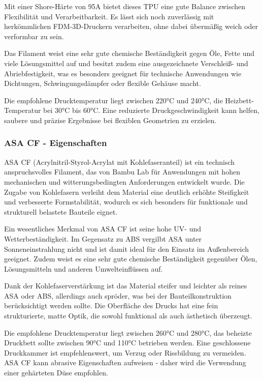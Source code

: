 \documentclass[a4paper,12pt]{article}
\begin{document}
Mit einer Shore-Härte von 95A bietet dieses TPU eine gute Balance zwischen Flexibilität und Verarbeitbarkeit. Es lässt sich noch zuverlässig mit herkömmlichen FDM-3D-Druckern verarbeiten, ohne dabei übermäßig weich oder verformbar zu sein.

Das Filament weist eine sehr gute chemische Beständigkeit gegen Öle, Fette und viele Lösungsmittel auf und besitzt zudem eine ausgezeichnete Verschleiß- und Abriebfestigkeit, was es besonders geeignet für technische Anwendungen wie Dichtungen, Schwingungsdämpfer oder flexible Gehäuse macht.

Die empfohlene Drucktemperatur liegt zwischen 220°C und 240°C, die Heizbett-Temperatur bei 30°C bis 60°C. Eine reduzierte Druckgeschwindigkeit kann helfen, saubere und präzise Ergebnisse bei flexiblen Geometrien zu erzielen.\cite{Bambu_Lab_Filament_TPU}\newline

\subsubsection{ASA CF - Eigenschaften}
\label{sec:ASA CF}

ASA CF (Acrylnitril-Styrol-Acrylat mit Kohlefaseranteil) ist ein technisch anspruchsvolles Filament, das von Bambu Lab für Anwendungen mit hohen mechanischen und witterungsbedingten Anforderungen entwickelt wurde. Die Zugabe von Kohlefasern verleiht dem Material eine deutlich erhöhte Steifigkeit und verbesserte Formstabilität, wodurch es sich besonders für funktionale und strukturell belastete Bauteile eignet.

Ein wesentliches Merkmal von ASA CF ist seine hohe UV- und Wetterbeständigkeit. Im Gegensatz zu ABS vergilbt ASA unter Sonneneinstrahlung nicht und ist damit ideal für den Einsatz im Außenbereich geeignet. Zudem weist es eine sehr gute chemische Beständigkeit gegenüber Ölen, Lösungsmitteln und anderen Umwelteinflüssen auf.

Dank der Kohlefaserverstärkung ist das Material steifer und leichter als reines ASA oder ABS, allerdings auch spröder, was bei der Bauteilkonstruktion berücksichtigt werden sollte. Die Oberfläche des Drucks hat eine fein strukturierte, matte Optik, die sowohl funktional als auch ästhetisch überzeugt.

Die empfohlene Drucktemperatur liegt zwischen 260°C und 280°C, das beheizte Druckbett sollte zwischen 90°C und 110°C betrieben werden. Eine geschlossene Druckkammer ist empfehlenswert, um Verzug oder Rissbildung zu vermeiden. ASA CF kann abrasive Eigenschaften aufweisen - daher wird die Verwendung einer gehärteten Düse empfohlen.
\end{document}
